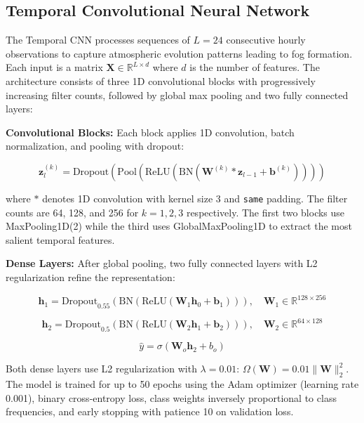 \documentclass[
  letterpaper,
  DIV=11,
  numbers=noendperiod]{scrartcl}
\begin{document}
\subsection{Temporal Convolutional Neural
Network}\label{temporal-convolutional-neural-network}

The Temporal CNN processes sequences of \(L = 24\) consecutive hourly
observations to capture atmospheric evolution patterns leading to fog
formation. Each input is a matrix
\(\mathbf{X} \in \mathbb{R}^{L \times d}\) where \(d\) is the number of
features. The architecture consists of three 1D convolutional blocks
with progressively increasing filter counts, followed by global max
pooling and two fully connected layers:

\textbf{Convolutional Blocks:} Each block applies 1D convolution, batch
normalization, and pooling with dropout:

\[\mathbf{z}_l^{(k)} = \text{Dropout}\left(\text{Pool}\left(\text{ReLU}\left(\text{BN}\left(\mathbf{W}^{(k)} * \mathbf{z}_{l-1} + \mathbf{b}^{(k)}\right)\right)\right)\right)\]

where \(*\) denotes 1D convolution with kernel size 3 and \texttt{same}
padding. The filter counts are 64, 128, and 256 for \(k = 1, 2, 3\)
respectively. The first two blocks use MaxPooling1D(2) while the third
uses GlobalMaxPooling1D to extract the most salient temporal features.

\textbf{Dense Layers:} After global pooling, two fully connected layers
with L2 regularization refine the representation:

\[\mathbf{h}_1 = \text{Dropout}_{0.55}\left(\text{BN}\left(\text{ReLU}(\mathbf{W}_1 \mathbf{h}_0 + \mathbf{b}_1)\right)\right), \quad \mathbf{W}_1 \in \mathbb{R}^{128 \times 256}\]

\[\mathbf{h}_2 = \text{Dropout}_{0.5}\left(\text{BN}\left(\text{ReLU}(\mathbf{W}_2 \mathbf{h}_1 + \mathbf{b}_2)\right)\right), \quad \mathbf{W}_2 \in \mathbb{R}^{64 \times 128}\]

\[\hat{y} = \sigma(\mathbf{W}_o \mathbf{h}_2 + b_o)\]

Both dense layers use L2 regularization with \(\lambda = 0.01\):
\(\Omega(\mathbf{W}) = 0.01 \|\mathbf{W}\|_2^2\). The model is trained
for up to 50 epochs using the Adam optimizer (learning rate 0.001),
binary cross-entropy loss, class weights inversely proportional to class
frequencies, and early stopping with patience 10 on validation loss.
\end{document}
